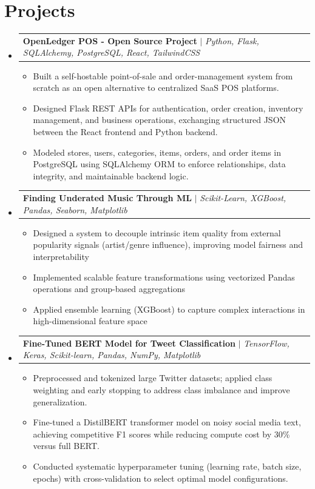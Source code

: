 \documentclass[letterpaper,11pt]{article}
\makeatletter
\newcommand{\resumeItem}[1]{
  \item\small{
    {#1 \vspace{-2pt}}
  }
}
\newcommand{\resumeProjectHeading}[2]{
    \item
    \begin{tabular*}{0.97\textwidth}{l@{\extracolsep{\fill}}r}
      \small#1 & #2 \\
    \end{tabular*}\vspace{-7pt}
}
\newcommand{\resumeSubHeadingListStart}{\begin{itemize}[leftmargin=0.15in, label={}]}
\newcommand{\resumeSubHeadingListEnd}{\end{itemize}}
\newcommand{\resumeItemListStart}{\begin{itemize}}
\newcommand{\resumeItemListEnd}{\end{itemize}\vspace{-5pt}}
\makeatother
\begin{document}
\section{Projects}
    \resumeSubHeadingListStart
    \resumeProjectHeading
              {\textbf{OpenLedger POS - Open Source Project} $|$ \emph{ Python, Flask, SQLAlchemy, PostgreSQL, React, TailwindCSS
    }}{}
              \resumeItemListStart
                \resumeItem{Built a self-hostable point-of-sale and order-management system from scratch as an open alternative to centralized SaaS POS platforms.}
                \resumeItem{Designed Flask REST APIs for authentication, order creation, inventory management, and business operations, exchanging structured JSON between the React frontend and Python backend.}
                \resumeItem{Modeled stores, users, categories, items, orders, and order items in PostgreSQL using SQLAlchemy ORM to enforce relationships, data integrity, and maintainable backend logic.}
              \resumeItemListEnd
    \resumeProjectHeading
          {\textbf{Finding Underated Music Through ML} $|$ \emph{Scikit-Learn, XGBoost, Pandas, Seaborn, Matplotlib}}{}
          \resumeItemListStart
            \resumeItem{Designed a system to decouple intrinsic item quality from external popularity signals (artist/genre influence), improving model fairness and interpretability}
            \resumeItem{Implemented scalable feature transformations using vectorized Pandas operations and group-based aggregations}
            \resumeItem{Applied ensemble learning (XGBoost) to capture complex interactions in high-dimensional feature space}
          \resumeItemListEnd
    
    
      \resumeProjectHeading
          {\textbf{Fine-Tuned BERT Model for Tweet Classification} $|$ \emph{TensorFlow, Keras, Scikit-learn, Pandas, NumPy, Matplotlib}}{}
          \resumeItemListStart
            \resumeItem{Preprocessed and tokenized large Twitter datasets; applied class weighting and early stopping to address class imbalance and improve generalization.}
            \resumeItem{Fine-tuned a DistilBERT transformer model on noisy social media text, achieving competitive F1 scores while reducing compute cost by 30\% versus full BERT.}
            \resumeItem{Conducted systematic hyperparameter tuning (learning rate, batch size, epochs) with cross-validation to select optimal model configurations.}
          \resumeItemListEnd
      

      
    \resumeSubHeadingListEnd
\end{document}
